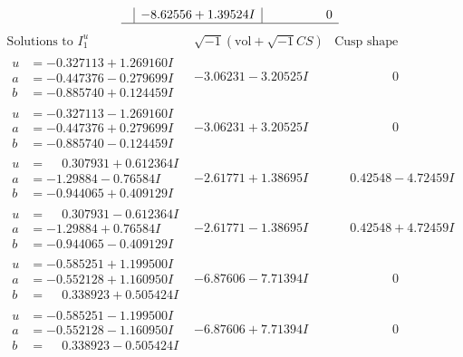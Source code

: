 \documentclass[1p]{elsarticle_modified}
\theoremstyle{definition}
\newcommand{\I}{\sqrt{-1}}
\begin{document}
$$\begin{array}{c|c|c}
 & -8.62556 + 1.39524 I & \phantom{-0.000000 } 0\\
 \hline 
 \end{array}$$\newpage$$\begin{array}{c|c|c}  
\text{Solutions to }I^u_{1}& \I (\text{vol} + \sqrt{-1}CS) & \text{Cusp shape}\\
 \hline 
\begin{aligned}
u &= -0.327113 + 1.269160 I \\
a &= -0.447376 - 0.279699 I \\
b &= -0.885740 + 0.124459 I\end{aligned}
 & -3.06231 - 3.20525 I & \phantom{-0.000000 } 0 \\ \hline\begin{aligned}
u &= -0.327113 - 1.269160 I \\
a &= -0.447376 + 0.279699 I \\
b &= -0.885740 - 0.124459 I\end{aligned}
 & -3.06231 + 3.20525 I & \phantom{-0.000000 } 0 \\ \hline\begin{aligned}
u &= \phantom{-}0.307931 + 0.612364 I \\
a &= -1.29884 - 0.76584 I \\
b &= -0.944065 + 0.409129 I\end{aligned}
 & -2.61771 + 1.38695 I & \phantom{-}0.42548 - 4.72459 I \\ \hline\begin{aligned}
u &= \phantom{-}0.307931 - 0.612364 I \\
a &= -1.29884 + 0.76584 I \\
b &= -0.944065 - 0.409129 I\end{aligned}
 & -2.61771 - 1.38695 I & \phantom{-}0.42548 + 4.72459 I \\ \hline\begin{aligned}
u &= -0.585251 + 1.199500 I \\
a &= -0.552128 + 1.160950 I \\
b &= \phantom{-}0.338923 + 0.505424 I\end{aligned}
 & -6.87606 - 7.71394 I & \phantom{-0.000000 } 0 \\ \hline\begin{aligned}
u &= -0.585251 - 1.199500 I \\
a &= -0.552128 - 1.160950 I \\
b &= \phantom{-}0.338923 - 0.505424 I\end{aligned}
 & -6.87606 + 7.71394 I & \phantom{-0.000000 } 0 \\ \hline\begin{aligned}

\end{aligned}
\end{array}$$
\end{document}
